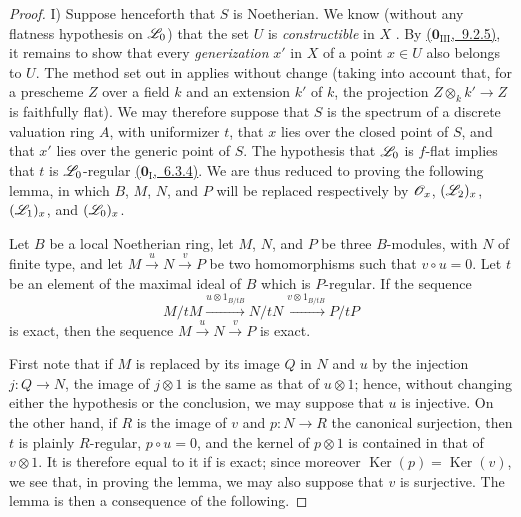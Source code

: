 \begin{proof}
\medskip
I) Suppose henceforth that $S$ is Noetherian.
We know (without any flatness hypothesis on $\mathscr{L}_0$) that the set $U$ is \emph{constructible} in $X$ .
By \hyperref[0.9.2.5]{($\mathbf{0}_{\mathrm{III}}$,~9.2.5)}, it remains to show that every \emph{generization} $x'$ in $X$ of a point $x\in U$ also belongs to $U$.
The method set out in  applies without change (taking into account that, for a prescheme $Z$ over a field $k$ and an extension $k'$ of $k$, the projection $Z\otimes_k k'\to Z$ is faithfully flat).
We may therefore suppose that $S$ is the spectrum of a discrete valuation ring $A$, with uniformizer $t$, that $x$ lies over the closed point of $S$, and that $x'$ lies over the generic point of $S$.
The hypothesis that $\mathscr{L}_0$ is $f$-flat implies that $t$ is $\mathscr{L}_0$-regular \hyperref[0.6.3.4]{($\mathbf{0}_{\mathrm{I}}$,~6.3.4)}.
We are thus reduced to proving the following lemma, in which $B$, $M$, $N$, and $P$ will be replaced respectively by $\mathscr{O}_x$, $(\mathscr{L}_2)_x$, $(\mathscr{L}_1)_x$, and $(\mathscr{L}_0)_x$.

\begin{lemma}[12.3.3.1]
\label{IV.12.3.3.1}
Let $B$ be a local Noetherian ring, let $M$, $N$, and $P$ be three $B$-modules, with $N$ of finite type, and let
$M\xrightarrow{u}N\xrightarrow{v}P$ be two homomorphisms such that $v\circ u=0$.
Let $t$ be an element of the maximal ideal of $B$ which is $P$-regular.
If the sequence
\begin{equation}
\tag{12.3.3.2}
\label{IV.12.3.3.2}
M/tM \xrightarrow{u\otimes 1_{B/tB}} N/tN \xrightarrow{v\otimes 1_{B/tB}} P/tP
\end{equation}
is exact, then the sequence $M\xrightarrow{u}N\xrightarrow{v}P$ is exact.
\end{lemma}

First note that if $M$ is replaced by its image $Q$ in $N$ and $u$ by the injection $j:Q\to N$, the image of $j\otimes 1$ is the same as that of $u\otimes 1$; hence, without changing either the hypothesis or the conclusion, we may suppose that $u$ is injective.
On the other hand, if $R$ is the image of $v$ and $p:N\to R$ the canonical surjection, then $t$ is plainly $R$-regular, $p\circ u=0$, and the kernel of $p\otimes 1$ is contained in that of $v\otimes 1$.
It is therefore equal to it if  is exact; since moreover $\operatorname{Ker}(p)=\operatorname{Ker}(v)$,
we see that, in proving the lemma, we may also suppose that $v$ is surjective.
The lemma is then a consequence of the following.


\end{proof}
